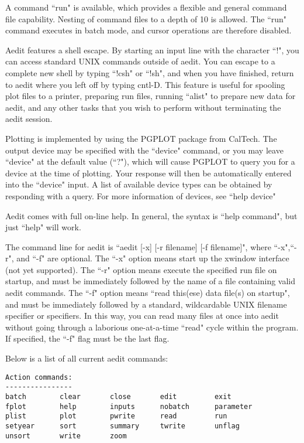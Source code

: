 \begin{center}
A command ``run" is available, which provides a flexible and 
general command file capability.  Nesting of command files to a 
depth of 10 is allowed.  The ``run" command executes in batch mode, 
and cursor operations are therefore disabled.

Aedit features a shell escape.  By starting an input line with the
character ``!", you can access standard UNIX commands outside of
aedit.  You can escape to a complete new shell by typing ``!csh" or
``!sh", and when you have finished, return to aedit where you left
off by typing cntl-D.  This feature is useful for spooling plot
files to a printer, preparing run files, running ``alist" to prepare
new data for aedit, and any other tasks that you wish to perform
without terminating the aedit session.

Plotting is implemented by using the PGPLOT package from CalTech.
The output device may be specified with the ``device" command, or
you may leave ``device" at the default value (``?"), which will
cause PGPLOT to query you for a device at the time of plotting.
Your response will then be automatically entered into the ``device"
input.  A list of available device types can be obtained by responding
with a query.  For more information of devices, see ``help device"

Aedit comes with full on-line help.  In general, the syntax is
``help command", but just ``help" will work.

The command line for aedit is ``aedit [-x] [-r filename] [-f filename]",
where ``-x",``-r", and ``-f" are optional.  The ``-x" option means start
up the xwindow interface (not yet supported).  The ``-r" option means
execute the specified run file on startup, and must be immediately
followed by the name of a file containing valid aedit commands.  The ``-f" 
option means ``read this(ese) data file(s) on startup", and must be 
immediately followed by a standard, wildcardable UNIX filename specifier 
or specifiers.  In this way, you can read many files at once into aedit
without going through a laborious one-at-a-time ``read" cycle within
the program. If specified, the ``-f" flag must be the last flag.

Below is a list of all current aedit commands:

\begin{verbatim}
Action commands:
----------------
batch        clear       close       edit         exit
fplot        help        inputs      nobatch      parameter
plist        plot        pwrite      read         run
setyear      sort        summary     twrite       unflag
unsort       write       zoom



\end{verbatim}
\end{center}

